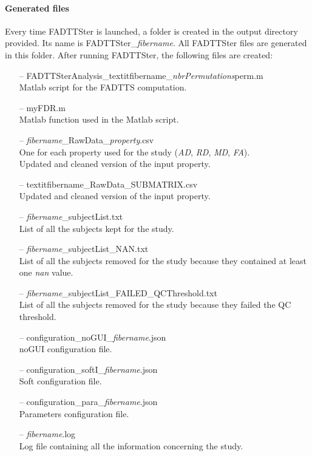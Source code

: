\documentclass[fadttsterUserGuide_use]{subfiles}
\begin{document}
	\paragraph{Generated files}
	Every time FADTTSter is launched, a folder is created in the output directory provided. Its name is FADTTSter\_\textit{fibername}. All FADTTSter files are generated in this folder. After running FADTTSter, the following files are created:
	\begin{itemize}
		\item[--] FADTTSterAnalysis\_textit{fibername}\_\textit{nbrPermutations}perm.m\\
		Matlab script for the FADTTS computation.
		\item[--] myFDR.m\\
		Matlab function used in the Matlab script.
		\item[--] \textit{fibername}\_RawData\_\textit{property}.csv\\
		One for each property used for the study (\textit{AD}, \textit{RD}, \textit{MD}, \textit{FA}).\\
		Updated and cleaned version of the input property.
		\item[--] textit{fibername}\_RawData\_SUBMATRIX.csv\\
		Updated and cleaned version of the input property.
		\item[--] \textit{fibername}\_subjectList.txt\\
		List of all the subjects kept for the study.
		\item[--] \textit{fibername}\_subjectList\_NAN.txt\\
		List of all the subjects removed for the study because they contained at least one \textit{nan} value.
		\item[--] \textit{fibername}\_subjectList\_FAILED\_QCThreshold.txt\\
		List of all the subjects removed for the study because they failed the QC threshold.
		\item[--] configuration\_noGUI\_\textit{fibername}.json\\
		noGUI configuration file.
		\item[--] configuration\_softI\_\textit{fibername}.json\\
		Soft configuration file.
		\item[--] configuration\_para\_\textit{fibername}.json\\
		Parameters configuration file.
		\item[--] \textit{fibername}.log\\
		Log file containing all the information concerning the study.
	\end{itemize}
	\vfill
	\newpage
	
\end{document}

